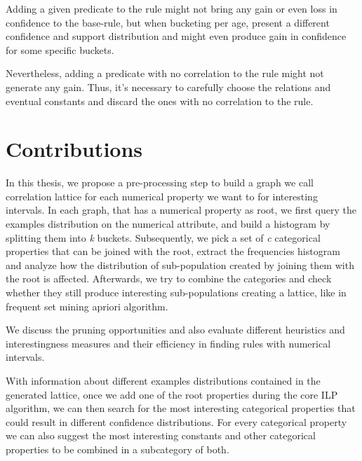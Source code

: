 Adding a given predicate to the rule might not bring any gain or even loss in confidence to the base-rule, but when
bucketing per age, present a different confidence and support distribution and might even produce gain in confidence for
some specific buckets.

Nevertheless, adding a predicate with no correlation to the rule might not generate any gain. Thus, it's necessary to
carefully choose the relations and eventual constants and discard the ones with no correlation to the rule.  

\section{Contributions}
In this thesis, we propose a pre-processing step to build a graph we call correlation lattice for each numerical
property we want to for interesting intervals. In each graph, that has a numerical property as root, we first query the
examples distribution on the numerical attribute, and build a histogram by splitting them into \emph{k} buckets.
Subsequently, we  pick a set of \emph{c} categorical properties that can be joined with the root, extract the
frequencies histogram and analyze how the distribution of sub-population created by joining them with the root is
affected. Afterwards, we try to combine the categories and check whether they still produce interesting sub-populations
creating a lattice, like in frequent set mining apriori algorithm.

We discuss the pruning opportunities and also evaluate different heuristics and interestingness measures and their
efficiency in finding rules with numerical intervals. 

\begin{comment}
In a clause containing a numerical attribute in the body, we can obtain a support and confidence as well as support
value for each of the buckets. Therewith, we can search the most interesting intervals that satisfies the support and
confidence thresholds
\end{comment}

With information about different examples distributions contained in the generated lattice, once we add one of the root
properties during the core ILP algorithm, we can then search for the most interesting categorical properties that could
result in different confidence distributions. For every categorical property we can also suggest the most interesting
constants and other categorical properties to be combined in a subcategory of both.

